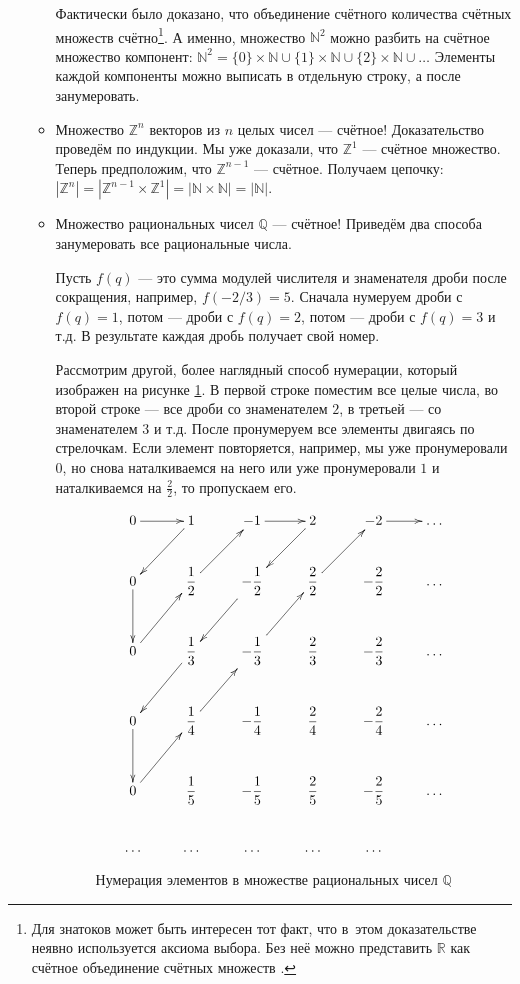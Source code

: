 \documentclass[pdftex, 12pt, a4paper]{article}
\def \mbb{\mathbb}
\def \N{\mbb N}
\def \Z{\mbb Z}
\def \QQ{\mbb Q}
\def\R{\ensuremath{\mathbb{R}}} %
\theoremstyle{definition} %
\numberwithin{problem}{section}
\numberwithin{blits}{section}
\begin{document}
\begin{itemize}
\begin{itemize}
Фактически было доказано, что объединение счётного количества счётных множеств счётно\footnote{Для знатоков может быть интересен тот факт, что в~этом доказательстве неявно используется аксиома выбора. Без неё можно представить $\R$ как счётное объединение счётных множеств \cite{williams:wto}.}. А именно, множество $\N^2$ можно разбить на счётное множество компонент: $\N^2 = \{0\} \times \N \cup \{1\} \times \N \cup \{2\} \times \N \cup \dots$ Элементы каждой компоненты можно выписать в отдельную строку, а после занумеровать.

\item Множество $\Z^{n}$ векторов из $n$ целых чисел  --- счётное!
Доказательство проведём по индукции. Мы уже доказали, что $\Z^{1}$ --- счётное множество. Теперь предположим, что $ \Z^{n-1} $ --- счётное. Получаем цепочку: $ |\Z^{n}|=| \Z^{n-1} \times \Z^{1}| =|\N \times \N| = |\N| $.

\item Множество рациональных чисел $\QQ $ --- счётное! Приведём два способа занумеровать все рациональные числа.

Пусть $ f(q) $ --- это сумма модулей числителя и знаменателя дроби после сокращения, например, $ f(-2/3)=5 $. Сначала нумеруем дроби с $f(q)=1$, потом --- дроби с $ f(q)=2 $, потом --- дроби с $f(q)=3$ и т.д. В результате каждая дробь получает свой номер.



Рассмотрим другой, более наглядный способ нумерации, который изображен на рисунке \ref{Q}. В первой строке поместим все целые числа, во второй строке --- все дроби со знаменателем $2$, в третьей --- со знаменателем $3$ и т.д. После пронумеруем все элементы двигаясь по стрелочкам. Если элемент повторяется, например, мы уже пронумеровали $0$, но снова наталкиваемся на него или уже пронумеровали $1$ и наталкиваемся на $\frac{2}{2}$, то пропускаем его.

\begin{figure}[H]
\begin{center}
\[ \xymatrix{
0 \ar[r] &  1 \ar[ld]  &  -1 \ar[r]  &  2 \ar[ld]  &  -2  \ar[r] & \dots  \\
0 \ar[d] & \dfrac{1}{2} \ar[ru]  & -\dfrac{1}{2} \ar[ld]  & \dfrac{2}{2} \ar[ur] & -\dfrac{2}{2} &  \dots\\
0 \ar[ru] & \dfrac{1}{3} \ar[ld] & -\dfrac{1}{3} \ar[ur] & \dfrac{2}{3} & -\dfrac{2}{3}  & \dots \\
0 \ar[d] & \dfrac{1}{4} \ar[ur] & -\dfrac{1}{4} & \dfrac{2}{4} & -\dfrac{2}{4}  & \dots \\
0 \ar[ur] & \dfrac{1}{5} & -\dfrac{1}{5} & \dfrac{2}{5} & -\dfrac{2}{5}  & \dots \\
\dots & \dots & \dots & \dots & \dots  }
\]
\end{center}
\caption{Нумерация элементов в множестве рациональных чисел $\QQ$}\label{Q}
\end{figure}



\end{itemize}
\end{itemize}
\end{document}
